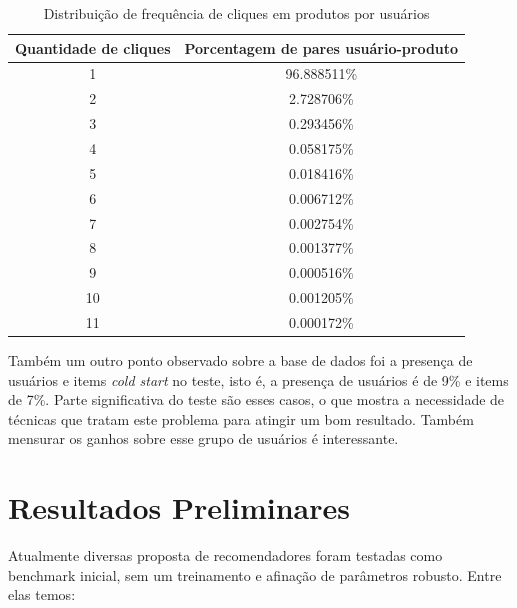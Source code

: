 \documentclass{article}
\begin{document}
\begin{table}[!hbt]
\begin{center}
\begin{tabular}{|c|c|}
\hline
Quantidade de cliques &   Porcentagem de pares usuário-produto \\\hline
1  &  96.888511\% \\\hline
2  &   2.728706\% \\\hline
3  &   0.293456\% \\\hline
4  &   0.058175\% \\\hline
5  &   0.018416\% \\\hline
6  &   0.006712\% \\\hline
7  &   0.002754\% \\\hline
8  &   0.001377\% \\\hline
9  &   0.000516\% \\\hline
10 &   0.001205\% \\\hline
11 &   0.000172\% \\\hline
\end{tabular}
\end{center}
\caption{Distribuição de frequência de cliques em produtos por usuários}
  \label{tbl:productuser}
\end{table}

Também um outro ponto observado sobre a base de dados foi a presença de usuários e items \textit{cold start} no teste, isto é, a presença de usuários é de 9\% e items de 7\%. Parte significativa do teste são esses casos, o que mostra a necessidade de técnicas que tratam este problema para atingir um bom resultado. Também mensurar os ganhos sobre esse grupo de usuários é interessante.

\section{Resultados Preliminares}

Atualmente diversas proposta de recomendadores foram testadas como benchmark inicial, sem um treinamento e afinação de parâmetros robusto. Entre elas temos:
\end{document}
